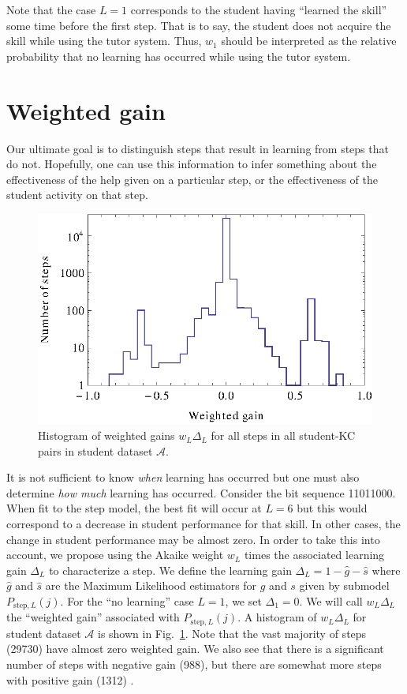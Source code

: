 \documentclass{acmlarge-edm}
\begin{document}
Note that the case $L=1$ corresponds to the student having 
``learned the skill'' some time before the first step.  That is to say, 
the student does not acquire the skill while using the tutor system.
Thus, $w_1$ should be interpreted as the relative probability
that no learning has occurred while using the tutor system.

\section{Weighted gain}

Our ultimate goal is to distinguish steps that result in 
learning from steps that do not.  Hopefully, one can use this
information to infer something about the effectiveness of the help
given on a particular step, or the effectiveness of
the student activity on that step.

\begin{figure}
  \centering \includegraphics{weighted-gain-histogram.eps}
   \caption{Histogram of weighted gains $w_L \Delta_L$ for
     all steps in all student-KC pairs in student dataset $\mathcal{A}$.}
    \label{weighted-gain-histogram}
\end{figure}

It is not sufficient to know {\it when} learning has occurred but one
must also determine {\it how much} learning has occurred.  Consider
the bit sequence 11011000.  When fit to the step model, the best fit
will occur at $L=6$ but this would correspond to a decrease in student
performance for that skill.  In other cases, the change in student
performance may be almost zero.  In order to take this into account,
we propose using the Akaike weight $w_L$ times the associated learning
gain $\Delta_L$ to characterize a step.  We define the learning gain
$\Delta_L=1-\hat{g}-\hat{s}$ where $\hat{g}$ and $\hat{s}$ are the
Maximum Likelihood estimators for $g$ and $s$ given by submodel
$P_{\mathrm{step},L}(j)$.  For the ``no learning'' case $L=1$, we set
$\Delta_1=0$.  We will call $w_L \Delta_L$ the ``weighted gain''
associated with $P_{\mathrm{step},L}(j)$.  A histogram of $w_L
\Delta_L$ for student dataset $\mathcal{A}$ is shown in
Fig.~\ref{weighted-gain-histogram}.  Note that the vast majority of
steps (29730) have almost zero weighted gain.  We also see that there
is a significant number of steps with negative gain (988), but there
are somewhat more steps with positive gain (1312) .
\end{document}
